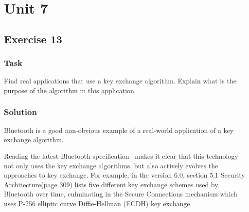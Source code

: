 \chapter{Unit 7}
\section{Exercise 13}

\subsection{Task}
Find real applications that use a key exchange algorithm. Explain
what is the purpose of the algorithm in this application.

\subsection{Solution}

Bluetooth is a good non-obvious example of a real-world application of a key exchange algorithm.

Reading the latest Bluetooth specification~\cite{bluetooth} makes it clear that this technology not only uses the key exchange algorithms, but also actively evolves the approaches to key exchange.
For example, in the version 6.0, section 5.1 Security Architecture(page 309) lists five different key exchange schemes used by Bluetooth over time, culminating in the Secure Connections mechanism which uses P-256 elliptic curve Diffie-Hellman (ECDH) key exchange.